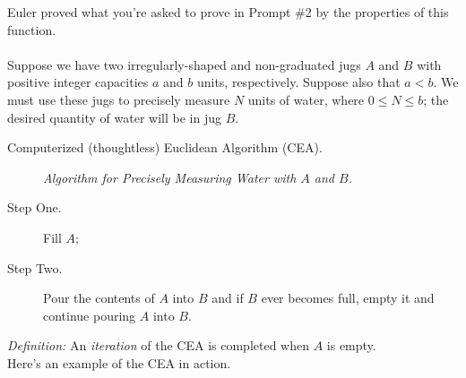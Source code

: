 \documentclass[10pt]{article}
\begin{document}
	Euler proved what you're asked to prove in Prompt  \#2 by the properties of this function.\\
	
	
	\\
	
	Suppose we have two irregularly-shaped and non-graduated jugs $A$ and $B$ with positive integer capacities $a$ and $b$ units, respectively.
	Suppose also that $a < b$.
	We must use these jugs to precisely measure $N$ units of water, where $0 \leq N \leq b$;
	the desired quantity of water will be in jug $B$.\\
	
	\begin{description}
		\item[Computerized (thoughtless) Euclidean Algorithm (CEA).] \emph{Algorithm for Precisely Measuring Water with $A$ and $B$.}
		\item[Step One.] Fill $A$;
		\item[Step Two.] Pour the contents of $A$ into $B$ and if $B$ ever becomes full, empty it and continue pouring $A$ into $B$.
	\end{description}
	\emph{Definition:} An \emph{iteration} of the CEA is completed when $A$ is empty.\\
	
	Here's an example of the CEA in action.\\
	
\end{document}
